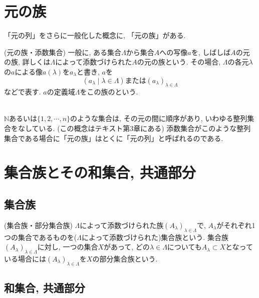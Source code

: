 \documentclass[a4j]{jsarticle}
\begin{document}
\section{元の族}

「元の列」をさらに一般化した概念に, 「元の族」がある. \\

\begin{itembox}[l]{ (元の族・添数集合)}
  一般に, ある集合$\Lambda$から集合$A$への写像$a$を, しばしば$A$の元の族, 詳しくは$\Lambda$によって添数づけられた$A$の元の族という. その場合, $\Lambda$の各元$\lambda$の$a$による像$a(\lambda)$を$a_\lambda$と書き, $a$を$$ (a_\lambda \mid \lambda \in \Lambda) または (a_\lambda)_{\lambda \in \Lambda} $$などで表す. $a$の定義域$\Lambda$をこの族のという.
\end{itembox}\\

 $\mathbb{N}$あるいは$\{1,2,\cdots,n\}$のような集合は, その元の間に順序があり, いわゆる整列集合をなしている. (この概念はテキスト\cite{text}第3章にある) 添数集合がこのような整列集合である場合に「元の族」はとくに「元の列」と呼ばれるのである.

\section{集合族とその和集合, 共通部分}

\subsection{集合族}

\begin{itembox}[l]{ (集合族・部分集合族)}
  $\Lambda$によって添数づけられた族$(A_\lambda)_{\lambda \in \Lambda}$で, $A_\lambda$がそれぞれ1つの集合であるものを($\Lambda$によって添数づけられた)集合族という. 集合族$(A_\lambda)_{\lambda \in \Lambda}$に対し, 一つの集合$X$があって, どの$\lambda \in \Lambda$についても$A_\lambda \subset X$となっている場合には$(A_\lambda)_{\lambda \in \Lambda}$を$X$の部分集合族という.
\end{itembox}

\subsection{和集合, 共通部分}
\end{document}
